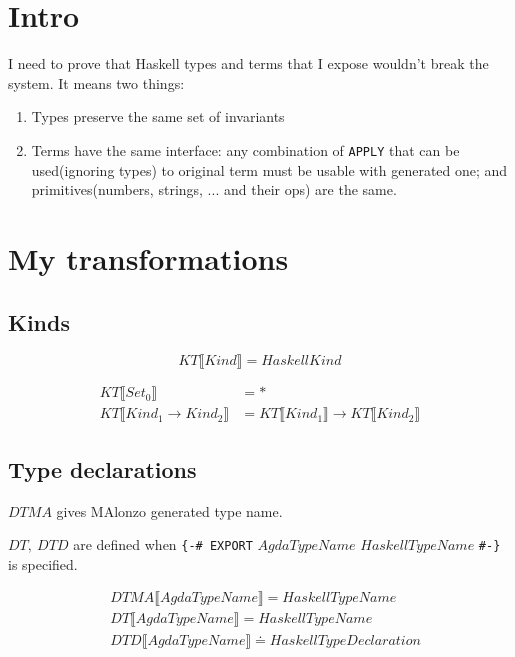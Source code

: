 \section{Intro}

I need to prove that Haskell types and terms that I expose wouldn't break the system.  It means two things:
\begin{enumerate}
\item Types preserve the same set of invariants
\item Terms have the same interface: any combination of \texttt{APPLY} that can be used(ignoring types) to original
      term must be usable with generated one; and primitives(numbers, strings, ... and their ops) are the same.
\end{enumerate}

\section{My transformations}

\subsection{Kinds}
\[ KT\llbracket Kind \rrbracket = HaskellKind \]

\begin{align*}
   KT\llbracket Set_0 \rrbracket &= *\\
   KT\llbracket Kind_1 \rightarrow Kind_2 \rrbracket &=
      KT\llbracket Kind_1 \rrbracket \rightarrow KT\llbracket Kind_2 \rrbracket
\end{align*}

\subsection{Type declarations}

\(DTMA\) gives MAlonzo generated type name.

\(DT,\ DTD\) are defined when \texttt{\{-\# EXPORT} \(AgdaTypeName\) \(HaskellTypeName\) \texttt{\#-\}} is specified.

\begin{align*}
   &DTMA\llbracket AgdaTypeName \rrbracket = HaskellTypeName\\
   &DT\llbracket AgdaTypeName \rrbracket = HaskellTypeName\\
   &DTD\llbracket AgdaTypeName \rrbracket \doteq HaskellTypeDeclaration\\
\end{align*}

